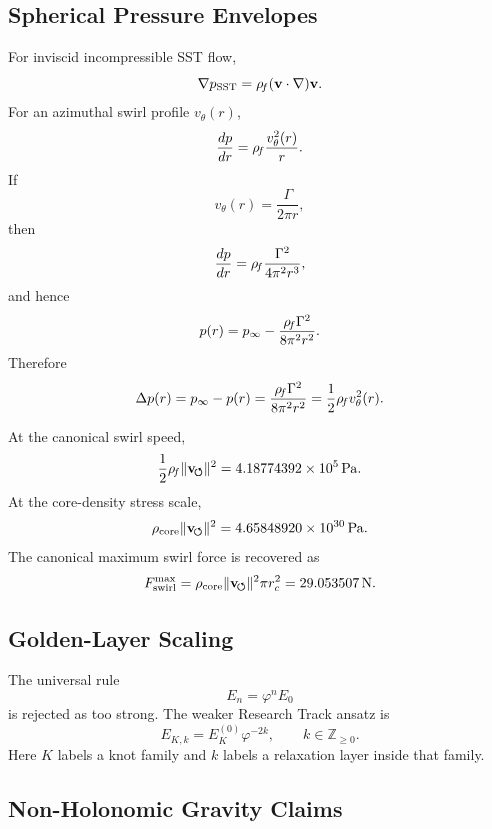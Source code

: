     \subsection{Spherical Pressure Envelopes}
        
        For inviscid incompressible SST flow,
        \[
            \nabla p_{\mathrm{SST}}
            =
            \rho_{\!f}(\mathbf v\cdot\nabla)\mathbf v .
        \]
        For an azimuthal swirl profile \(v_\theta(r)\),
        \[
            \frac{dp}{dr}
            =
            \rho_{\!f}\frac{v_\theta^2(r)}{r}.
        \]
        If
        \[
            v_\theta(r)=\frac{\Gamma}{2\pi r},
        \]
        then
        \[
            \frac{dp}{dr}
            =
            \rho_{\!f}\frac{\Gamma^2}{4\pi^2r^3},
        \]
        and hence
        \[
            p(r)
            =
            p_\infty
            -
            \frac{\rho_{\!f}\Gamma^2}{8\pi^2r^2}.
        \]
        Therefore
        \[
            \Delta p(r)
            =
            p_\infty-p(r)
            =
            \frac{\rho_{\!f}\Gamma^2}{8\pi^2r^2}
            =
            \frac{1}{2}\rho_{\!f} v_\theta^2(r).
        \]
        
        At the canonical swirl speed,
        \[
            \frac{1}{2}\rho_{\!f}\|\mathbf{v}_{\!\boldsymbol{\circlearrowleft}}\|^2
            =
            4.18774392\times10^5\,\mathrm{Pa}.
        \]
        At the core-density stress scale,
        \[
            \rho_{\text{core}}\|\mathbf{v}_{\!\boldsymbol{\circlearrowleft}}\|^2
            =
            4.65848920\times10^{30}\,\mathrm{Pa}.
        \]
        The canonical maximum swirl force is recovered as
        \[
            F_{\text{swirl}}^{\max}
            =
            \rho_{\text{core}}\|\mathbf{v}_{\!\boldsymbol{\circlearrowleft}}\|^2\pi r_c^2
            =
            29.053507\,\mathrm{N}.
        \]
    
    \subsection{Golden-Layer Scaling}
        
        The universal rule
        \[
            E_n=\varphi^nE_0
        \]
        is rejected as too strong. The weaker Research Track ansatz is
        \[
            E_{K,k}
            =
            E_K^{(0)}\varphi^{-2k},
            \qquad
            k\in\mathbb Z_{\ge0}.
        \]
        Here \(K\) labels a knot family and \(k\) labels a relaxation layer inside
        that family.
    
    \subsection{Non-Holonomic Gravity Claims}
        
